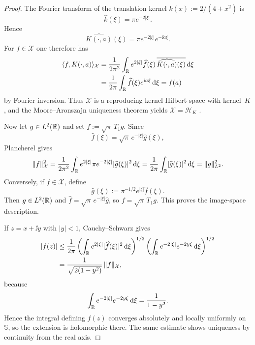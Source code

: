 \begin{proof}
The Fourier transform of the translation kernel $k(x):=2/(4+x^2)$ is
\[
\widehat k(\xi)=\pi e^{-2|\xi|}.
\]
Hence
\[
\widehat{K(\cdot,a)}(\xi)=\pi e^{-2|\xi|}e^{-\ii a\xi}.
\]
For $f\in\mathcal X$ one therefore has
\begin{align*}
\langle f,K(\cdot,a)\rangle_{\mathcal X}
&=
\frac{1}{2\pi^2}\int_{\mathbb{R}}
e^{2|\xi|}\widehat f(\xi)\,
\overline{\widehat{K(\cdot,a)}(\xi)}\,\mathrm{d}\xi \\
&=
\frac{1}{2\pi}\int_{\mathbb{R}}\widehat f(\xi)e^{\mathrm{i} a\xi}\,\mathrm{d}\xi
=f(a)
\end{align*}
by Fourier inversion.  Thus $\mathcal X$ is a reproducing-kernel Hilbert
space with kernel~$K$, and the Moore--Aronszajn uniqueness theorem yields
$\mathcal X=\mathcal H_K$ \cite{Aronszajn1950}.

Now let $g\in L^2(\mathbb{R})$ and set $f:=\sqrt{\pi}\,T_1 g$.  Since
\[
\widehat f(\xi)=\sqrt{\pi}\,e^{-|\xi|}\widehat g(\xi),
\]
Plancherel gives
\[
\|f\|_{\mathcal X}^2
=\frac{1}{2\pi^2}\int_{\mathbb{R}}e^{2|\xi|}\pi e^{-2|\xi|}
\lvert \widehat g(\xi)\rvert^2\,\mathrm{d}\xi
=\frac{1}{2\pi}\int_{\mathbb{R}}\lvert \widehat g(\xi)\rvert^2\,\mathrm{d}\xi
=\|g\|_{L^2}^2.
\]
Conversely, if $f\in\mathcal X$, define
\[
\widehat g(\xi):=\pi^{-1/2}e^{|\xi|}\widehat f(\xi).
\]
Then $g\in L^2(\mathbb{R})$ and
$\widehat f=\sqrt{\pi}\,e^{-|\xi|}\widehat g$, so
$f=\sqrt{\pi}\,T_1 g$.  This proves the image-space description.

If $z=x+\ii y$ with $|y|<1$, Cauchy--Schwarz gives
\begin{align*}
|f(z)|
&\le \frac{1}{2\pi}
\left(\int_{\mathbb{R}}e^{2|\xi|}\lvert \widehat f(\xi)\rvert^2\,\mathrm{d}\xi\right)^{1/2}
\left(\int_{\mathbb{R}}e^{-2|\xi|}e^{-2y\xi}\,\mathrm{d}\xi\right)^{1/2} \\
&=
\frac{1}{\sqrt{2(1-y^2)}}\,\|f\|_{\mathcal X},
\end{align*}
because
\[
\int_{\mathbb{R}}e^{-2|\xi|}e^{-2y\xi}\,\mathrm{d}\xi=\frac{1}{1-y^2}.
\]
Hence the integral defining $f(z)$ converges absolutely and locally
uniformly on $\mathbb S$, so the extension is holomorphic there.  The same
estimate shows uniqueness by continuity from the real axis.
\end{proof}
